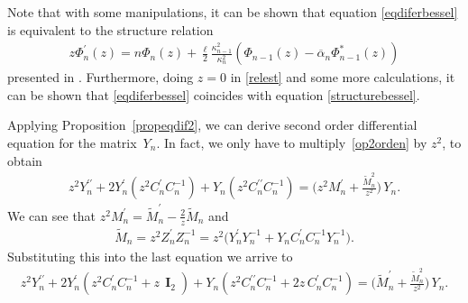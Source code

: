 \documentclass[12pt]{amsart}
\newtheorem{theorem}{Theorem}[section]
\newcommand{\dde}{\operatorname e}
\begin{document}

Note that with some manipulations, it can be shown that equation \eqref{eqdiferbessel} is equivalent to the structure relation
\begin{align}\label{relest}
z\Phi_{n}^\prime(z)=n\Phi_n(z)+\frac{\ell}{2}\frac{\kappa_{n-1}^2}{\kappa_n^2}(\Phi_{n-1}(z)-\overline{\alpha}_n\Phi_{n-1}^*(z))
\end{align}
presented in \cite{BRS23}. 
Furthermore, doing \(z=0 \) in \eqref{relest} and some more calculations, 
it can be shown that \eqref{eqdiferbessel} coincides with equation \eqref{structurebessel}. 

Applying Proposition~\ref{propeqdif2}, we can derive second order differential equation for the matrix~\(Y_n \). In fact, we only have to multiply~\eqref{op2orden} by \( z^2 \), to obtain
\begin{align*}
z^2Y_n^{\prime\prime}+2Y_n^{\prime} ( z^2C_n^{\prime}C_n^{-1} )+Y_n ( z^2 C_n^{\prime\prime} C_n^{-1}) =\Big( z^2 {M}_n^{\prime} + \frac{\widetilde{M}_n^2}{z^2} \Big) \, Y_n.
\end{align*}
We can see that
\( \displaystyle z^2 {M}_n^{\prime} = \widetilde M_n^\prime - \frac{2}{z} \widetilde M_n \)
and
\begin{align*}
 \widetilde M_n = z^2 Z_n^\prime Z_n^{-1} =
 z^2 \big( Y_n^\prime Y_n^{-1} + Y_n C_n^\prime C_n^{-1} Y_n^{-1} \big).
\end{align*}
Substituting this into the last equation we arrive to
\begin{align}\label{op2bessel}
 z^2Y_n^{\prime\prime}+2Y_n^{\prime} ( z^2C_n^{\prime}C_n^{-1}+z \, \mathbf{\operatorname I}_2 )+Y_n ( z^2C_n^{\prime\prime} C_n^{-1}+2z \, C_n^{\prime} C_n^{-1} ) =\Big( \widetilde{M}_n^{\prime}+\frac{\widetilde{M}_n^2}{z^2} \Big) \, Y_n.
\end{align}
\end{document}
